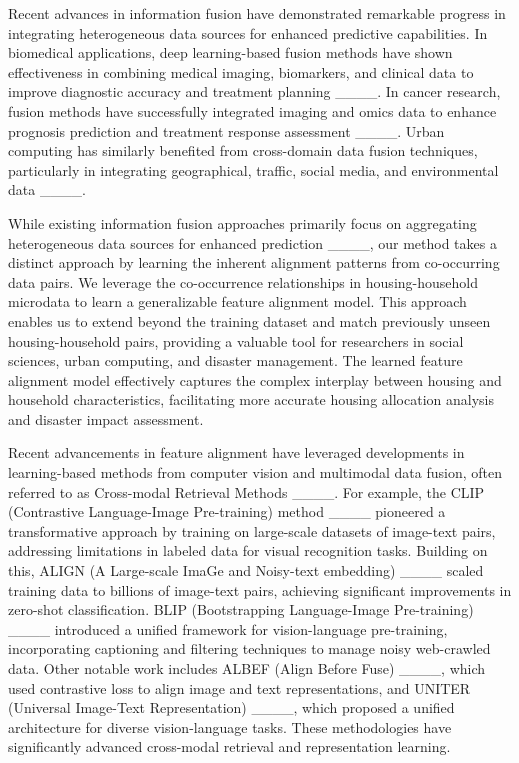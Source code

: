 Recent advances in information fusion have demonstrated remarkable progress in integrating heterogeneous data sources for enhanced predictive capabilities. In biomedical applications, deep learning-based fusion methods have shown effectiveness in combining medical imaging, biomarkers, and clinical data to improve diagnostic accuracy and treatment planning ____. In cancer research, fusion methods have successfully integrated imaging and omics data to enhance prognosis prediction and treatment response assessment ____.
Urban computing has similarly benefited from cross-domain data fusion techniques, particularly in integrating geographical, traffic, social media, and environmental data ____.

While existing information fusion approaches primarily focus on aggregating heterogeneous data sources for enhanced prediction ____, our method takes a distinct approach by learning the inherent alignment patterns from co-occurring data pairs. We leverage the co-occurrence relationships in housing-household microdata to learn a generalizable feature alignment model. This approach enables us to extend beyond the training dataset and match previously unseen housing-household pairs, providing a valuable tool for researchers in social sciences, urban computing, and disaster management. The learned feature alignment model effectively captures the complex interplay between housing and household characteristics, facilitating more accurate housing allocation analysis and disaster impact assessment.

Recent advancements in feature alignment have leveraged developments in learning-based methods from computer vision and multimodal data fusion, often referred to as Cross-modal Retrieval Methods ____. For example, the CLIP (Contrastive Language-Image Pre-training) method ____ pioneered a transformative approach by training on large-scale datasets of image-text pairs, addressing limitations in labeled data for visual recognition tasks. Building on this, ALIGN (A Large-scale ImaGe and Noisy-text embedding) ____ scaled training data to billions of image-text pairs, achieving significant improvements in zero-shot classification. BLIP (Bootstrapping Language-Image Pre-training) ____ introduced a unified framework for vision-language pre-training, incorporating captioning and filtering techniques to manage noisy web-crawled data. Other notable work includes ALBEF (Align Before Fuse) ____, which used contrastive loss to align image and text representations, and UNITER (Universal Image-Text Representation) ____, which proposed a unified architecture for diverse vision-language tasks. These methodologies have significantly advanced cross-modal retrieval and representation learning. 

